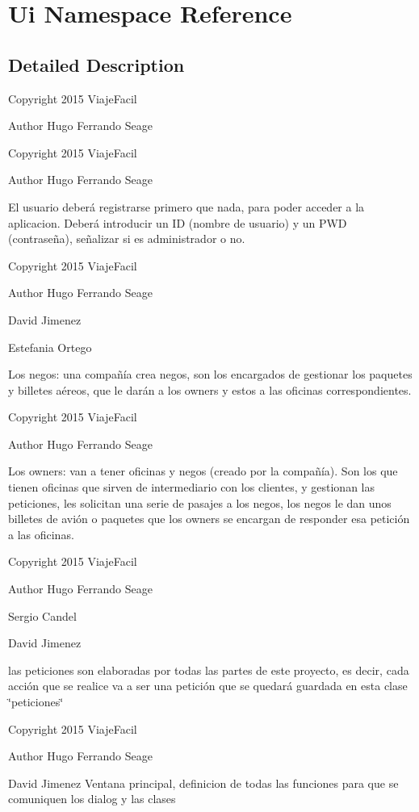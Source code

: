 \hypertarget{namespaceUi}{}\section{Ui Namespace Reference}
\label{namespaceUi}


\subsection{Detailed Description}
Copyright 2015 Viaje\+Facil \begin{DoxyAuthor}{Author}
Hugo Ferrando Seage
\end{DoxyAuthor}
Copyright 2015 Viaje\+Facil \begin{DoxyAuthor}{Author}
Hugo Ferrando Seage
\end{DoxyAuthor}
El usuario deberá registrarse primero que nada, para poder acceder a la aplicacion. Deberá introducir un I\+D (nombre de usuario) y un P\+W\+D (contraseña), señalizar si es administrador o no.

Copyright 2015 Viaje\+Facil \begin{DoxyAuthor}{Author}
Hugo Ferrando Seage 

David Jimenez 

Estefania Ortego
\end{DoxyAuthor}
Los negos\+: una compañía crea negos, son los encargados de gestionar los paquetes y billetes aéreos, que le darán a los owners y estos a las oficinas correspondientes.

Copyright 2015 Viaje\+Facil \begin{DoxyAuthor}{Author}
Hugo Ferrando Seage
\end{DoxyAuthor}
Los owners\+: van a tener oficinas y negos (creado por la compañía). Son los que tienen oficinas que sirven de intermediario con los clientes, y gestionan las peticiones, les solicitan una serie de pasajes a los negos, los negos le dan unos billetes de avión o paquetes que los owners se encargan de responder esa petición a las oficinas.

Copyright 2015 Viaje\+Facil \begin{DoxyAuthor}{Author}
Hugo Ferrando Seage 

Sergio Candel 

David Jimenez
\end{DoxyAuthor}
las peticiones son elaboradas por todas las partes de este proyecto, es decir, cada acción que se realice va a ser una petición que se quedará guardada en esta clase \char`\"{}peticiones\char`\"{}

Copyright 2015 Viaje\+Facil \begin{DoxyAuthor}{Author}
Hugo Ferrando Seage 

David Jimenez Ventana principal, definicion de todas las funciones para que se comuniquen los dialog y las clases 
\end{DoxyAuthor}
